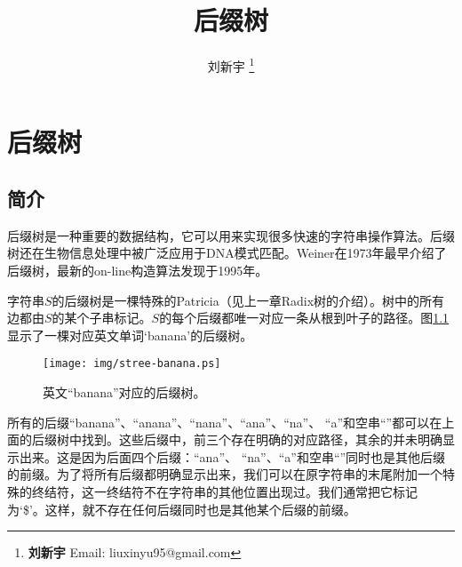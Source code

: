\documentclass[UTF8]{article}
\begin{document}


\title{后缀树}

\author{刘新宇
\thanks{{\bfseries 刘新宇 } \newline
  Email: liuxinyu95@gmail.com \newline}
  }

\maketitle
\fi


\ifx\wholebook\relax
\chapter{后缀树}
\fi


\section{简介}
\label{introduction}

后缀树是一种重要的数据结构，它可以用来实现很多快速的字符串操作算法\cite{wiki-suffix-tree}。后缀树还在生物信息处理中被广泛应用于DNA模式匹配\cite{ukkonen-presentation}。Weiner在1973年最早介绍了后缀树\cite{weiner73}，最新的on-line构造算法发现于1995年\cite{ukkonen95}。

字符串$S$的后缀树是一棵特殊的Patricia（见上一章Radix树的介绍）。树中的所有边都由$S$的某个子串标记。$S$的每个后缀都唯一对应一条从根到叶子的路径。图\ref{fig:stree-banana}显示了一棵对应英文单词‘banana’的后缀树。

\begin{figure}[htbp]
  \centering
  \texttt{[image: img/stree-banana.ps]}
  \caption{英文“banana”对应的后缀树。} \label{fig:stree-banana}
\end{figure}

所有的后缀“banana”、“anana”、“nana”、“ana”、“na”、
“a”和空串“”都可以在上面的后缀树中找到。这些后缀中，前三个存在明确的对应路径，其余的并未明确显示出来。这是因为后面四个后缀：“ana”、
“na”、“a”和空串“”同时也是其他后缀的前缀。为了将所有后缀都明确显示出来，我们可以在原字符串的末尾附加一个特殊的终结符，这一终结符不在字符串的其他位置出现过。我们通常把它标记为‘\$’。这样，就不存在任何后缀同时也是其他某个后缀的前缀。
\end{document}
